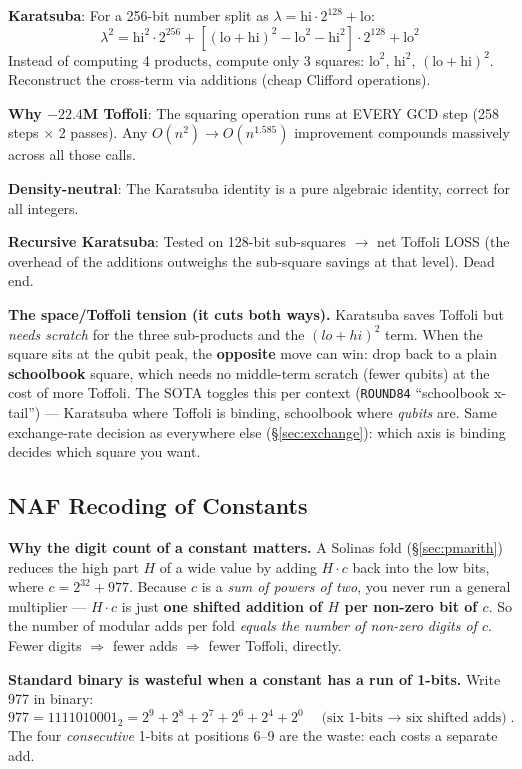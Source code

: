 \documentclass[11pt,a4paper]{article}
\begin{document}
\textbf{Karatsuba}: For a 256-bit number split as $\lambda = \text{hi} \cdot 2^{128} + \text{lo}$:
\[
  \lambda^2 = \text{hi}^2 \cdot 2^{256}
            + \left[(\text{lo}+\text{hi})^2 - \text{lo}^2 - \text{hi}^2\right] \cdot 2^{128}
            + \text{lo}^2
\]
Instead of computing 4 products, compute only 3 squares: $\text{lo}^2$, $\text{hi}^2$,
$(\text{lo}+\text{hi})^2$. Reconstruct the cross-term via additions (cheap Clifford operations).

\textbf{Why $-22.4$M Toffoli}: The squaring operation runs at EVERY GCD step (258 steps $\times$
2 passes). Any $O(n^2) \to O(n^{1.585})$ improvement compounds massively across all those calls.

\textbf{Density-neutral}: The Karatsuba identity is a pure algebraic identity, correct for all
integers.

\textbf{Recursive Karatsuba}: Tested on 128-bit sub-squares $\to$ net Toffoli LOSS (the overhead
of the additions outweighs the sub-square savings at that level). Dead end.

\textbf{The space/Toffoli tension (it cuts both ways).} Karatsuba saves Toffoli but \emph{needs
scratch} for the three sub-products and the $(lo+hi)^2$ term. When the square sits at the qubit peak,
the \textbf{opposite} move can win: drop back to a plain \textbf{schoolbook} square, which needs no
middle-term scratch (fewer qubits) at the cost of more Toffoli. The SOTA toggles this per context
(\texttt{ROUND84} ``schoolbook x-tail'') --- Karatsuba where Toffoli is binding, schoolbook where
\emph{qubits} are. Same exchange-rate decision as everywhere else (\S\ref{sec:exchange}): which axis
is binding decides which square you want.

\subsection{NAF Recoding of Constants}

\textbf{Why the digit count of a constant matters.} A Solinas fold (\S\ref{sec:pmarith}) reduces the
high part $H$ of a wide value by adding $H \cdot c$ back into the low bits, where $c = 2^{32} + 977$.
Because $c$ is a \emph{sum of powers of two}, you never run a general multiplier --- $H \cdot c$ is
just \textbf{one shifted addition of $H$ per non-zero bit of $c$}. So the number of modular adds per
fold \emph{equals the number of non-zero digits of $c$}. Fewer digits $\Rightarrow$ fewer adds
$\Rightarrow$ fewer Toffoli, directly.

\textbf{Standard binary is wasteful when a constant has a run of 1-bits.} Write 977 in binary:
\[
  977 = 1111010001_2 = 2^9 + 2^8 + 2^7 + 2^6 + 2^4 + 2^0 \quad\text{(six 1-bits $\to$ six shifted adds)}.
\]
The four \emph{consecutive} 1-bits at positions 6--9 are the waste: each costs a separate add.
\end{document}
